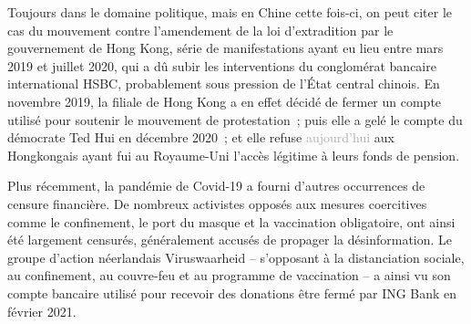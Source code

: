
Toujours dans le domaine politique, mais en Chine cette fois-ci, on peut citer le cas du mouvement contre l'amendement de la loi d'extradition par le gouvernement de Hong Kong, série de manifestations ayant eu lieu entre mars 2019 et juillet 2020, qui a dû subir les interventions du conglomérat bancaire international HSBC, probablement sous pression de l'État central chinois. En novembre 2019, la filiale de Hong Kong a en effet décidé de fermer un compte utilisé pour soutenir le mouvement de protestation~; puis elle a gelé le compte du démocrate Ted Hui en décembre 2020~; et elle refuse \textcolor{darkgray}{aujourd'hui} aux Hongkongais ayant fui au Royaume-Uni l'accès légitime à leurs fonds de pension.

Plus récemment, la pandémie de Covid-19 a fourni d'autres occurrences de censure financière. De nombreux activistes opposés aux mesures coercitives comme le confinement, le port du masque et la vaccination obligatoire, ont ainsi été largement censurés, généralement accusés de propager la désinformation. Le groupe d'action néerlandais Viruswaarheid -- s'opposant à la distanciation sociale, au confinement, au couvre-feu et au programme de vaccination -- a ainsi vu son compte bancaire utilisé pour recevoir des donations être fermé par ING Bank en février 2021.

